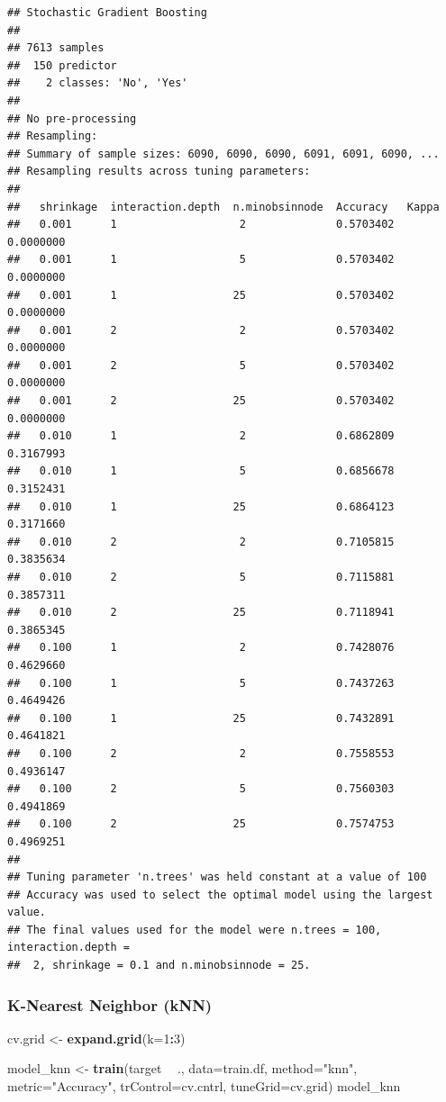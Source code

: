 \documentclass[
]{article}
\newenvironment{Shaded}{\begin{snugshade}}{\end{snugshade}}
\newcommand{\DataTypeTok}[1]{\textcolor[rgb]{0.13,0.29,0.53}{#1}}
\newcommand{\DecValTok}[1]{\textcolor[rgb]{0.00,0.00,0.81}{#1}}
\newcommand{\KeywordTok}[1]{\textcolor[rgb]{0.13,0.29,0.53}{\textbf{#1}}}
\newcommand{\NormalTok}[1]{#1}
\newcommand{\OperatorTok}[1]{\textcolor[rgb]{0.81,0.36,0.00}{\textbf{#1}}}
\newcommand{\StringTok}[1]{\textcolor[rgb]{0.31,0.60,0.02}{#1}}
\begin{document}
\begin{verbatim}
## Stochastic Gradient Boosting 
## 
## 7613 samples
##  150 predictor
##    2 classes: 'No', 'Yes' 
## 
## No pre-processing
## Resampling: 
## Summary of sample sizes: 6090, 6090, 6090, 6091, 6091, 6090, ... 
## Resampling results across tuning parameters:
## 
##   shrinkage  interaction.depth  n.minobsinnode  Accuracy   Kappa    
##   0.001      1                   2              0.5703402  0.0000000
##   0.001      1                   5              0.5703402  0.0000000
##   0.001      1                  25              0.5703402  0.0000000
##   0.001      2                   2              0.5703402  0.0000000
##   0.001      2                   5              0.5703402  0.0000000
##   0.001      2                  25              0.5703402  0.0000000
##   0.010      1                   2              0.6862809  0.3167993
##   0.010      1                   5              0.6856678  0.3152431
##   0.010      1                  25              0.6864123  0.3171660
##   0.010      2                   2              0.7105815  0.3835634
##   0.010      2                   5              0.7115881  0.3857311
##   0.010      2                  25              0.7118941  0.3865345
##   0.100      1                   2              0.7428076  0.4629660
##   0.100      1                   5              0.7437263  0.4649426
##   0.100      1                  25              0.7432891  0.4641821
##   0.100      2                   2              0.7558553  0.4936147
##   0.100      2                   5              0.7560303  0.4941869
##   0.100      2                  25              0.7574753  0.4969251
## 
## Tuning parameter 'n.trees' was held constant at a value of 100
## Accuracy was used to select the optimal model using the largest value.
## The final values used for the model were n.trees = 100, interaction.depth =
##  2, shrinkage = 0.1 and n.minobsinnode = 25.
\end{verbatim}

\hypertarget{k-nearest-neighbor-knn}{%
\subsubsection{K-Nearest Neighbor (kNN)}\label{k-nearest-neighbor-knn}}

\begin{Shaded}
\begin{Highlighting}[]
\NormalTok{cv.grid <-}\StringTok{ }\KeywordTok{expand.grid}\NormalTok{(}\DataTypeTok{k=}\DecValTok{1}\OperatorTok{:}\DecValTok{3}\NormalTok{)}

\NormalTok{model_knn <-}\StringTok{ }\KeywordTok{train}\NormalTok{(target }\OperatorTok{~}\StringTok{ }\NormalTok{., }\DataTypeTok{data=}\NormalTok{train.df,}
                   \DataTypeTok{method=}\StringTok{"knn"}\NormalTok{,}
                   \DataTypeTok{metric=}\StringTok{"Accuracy"}\NormalTok{,}
                   \DataTypeTok{trControl=}\NormalTok{cv.cntrl,}
                   \DataTypeTok{tuneGrid=}\NormalTok{cv.grid)}
\NormalTok{model_knn}
\end{Highlighting}
\end{Shaded}
\end{document}
